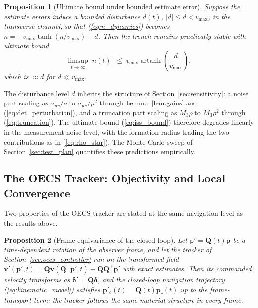 \documentclass[lettersize,journal]{IEEEtran}
\newtheorem{proposition}{Proposition}
\begin{document}
\begin{proposition}[Ultimate bound under bounded estimate error]
\label{prop:iss}
Suppose the estimate errors induce a bounded disturbance $d(t)$, $|d|
\leq \bar{d} < v_{\max}$, in the transverse channel, so that
(\ref{eq:n_dynamics}) becomes $\dot{n} = -v_{\max}\tanh(n/v_{\max}) +
d$. Then the trench remains practically stable with ultimate bound
\begin{equation}
    \limsup_{t\to\infty} |n(t)| \;\leq\;
    v_{\max}\operatorname{artanh}\!\left(\frac{\bar{d}}{v_{\max}}\right),
    \label{eq:iss_bound}
\end{equation}
which is $\approx \bar{d}$ for $\bar{d} \ll v_{\max}$.
\end{proposition}

The disturbance level $\bar{d}$ inherits the structure
of Section~\ref{sec:sensitivity}: a noise part scaling as
$\sigma_{uv}/\rho$ to $\sigma_{uv}/\rho^2$ through Lemma~\ref{lem:gains}
and (\ref{eq:det_perturbation}), and a truncation part scaling as
$M_3\rho$ to $M_3\rho^2$ through (\ref{eq:truncation}). The ultimate
bound (\ref{eq:iss_bound}) therefore
degrades linearly in the measurement noise level, with the formation
radius trading the two contributions as in (\ref{eq:rho_star}). The
Monte Carlo sweep of Section~\ref{sec:test_plan} quantifies these
predictions empirically.

\subsection{The OECS Tracker: Objectivity and Local Convergence}
\label{sec:stab_oecs}

Two properties of the OECS tracker are stated at the same navigation
level as the results above.

\begin{proposition}[Frame equivariance of the closed loop]
\label{prop:equivariance}
Let $\mathbf{p}'= \mathbf{Q}(t)\mathbf{p}$ be a time-dependent rotation
of the observer frame, and let the tracker of
Section~\ref{sec:oecs_controller} run on the transformed field
$\mathbf{v}'(\mathbf{p}', t) = \mathbf{Q}\mathbf{v}(\mathbf{Q}^\top
\mathbf{p}', t) + \dot{\mathbf{Q}}\mathbf{Q}^\top\mathbf{p}'$ with
exact estimates. Then its commanded velocity transforms as
$\boldsymbol{\delta}' = \mathbf{Q}\boldsymbol{\delta}$, and the
closed-loop navigation trajectory (\ref{eq:kinematic_model}) satisfies
$\mathbf{p}'_c(t) = \mathbf{Q}(t)\mathbf{p}_c(t)$ up to the
frame-transport term: the tracker follows the same material structure
in every frame.
\end{proposition}
\end{document}
